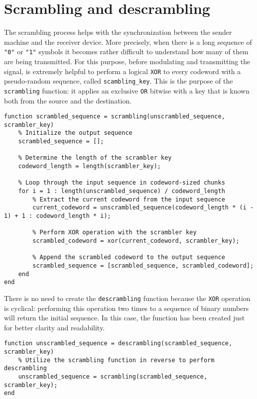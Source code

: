\vspace{40px} \section{Scrambling and descrambling}
The scrambling process helps with the synchronization between the sender machine and the receiver device. More precisely, when there is a long sequence of \texttt{"0"} or \texttt{"1"} symbols it becomes rather difficult to understand how many of them are being transmitted. For this purpose, before modulating and transmitting the signal, is extremely helpful to perform a logical \texttt{XOR} to every codeword with a pseudo-random sequence, called \texttt{scambling\_key}. This is the purpose of the \texttt{scrambling} function: it applies an exclusive \texttt{OR} bitwise with a key that is known both from the source and the destination.

\begin{lstlisting}
function scrambled_sequence = scrambling(unscrambled_sequence, scrambler_key)
    % Initialize the output sequence
    scrambled_sequence = [];

    % Determine the length of the scrambler key
    codeword_length = length(scrambler_key);

    % Loop through the input sequence in codeword-sized chunks
    for i = 1 : length(unscrambled_sequence) / codeword_length
        % Extract the current codeword from the input sequence
        current_codeword = unscrambled_sequence(codeword_length * (i - 1) + 1 : codeword_length * i);
        
        % Perform XOR operation with the scrambler key
        scrambled_codeword = xor(current_codeword, scrambler_key);

        % Append the scrambled codeword to the output sequence
        scrambled_sequence = [scrambled_sequence, scrambled_codeword];
    end
end
\end{lstlisting}

\noindent There is no need to create the \texttt{descrambling} function because the \texttt{XOR} operation is cyclical: performing this operation two times to a sequence of binary numbers will return the initial sequence. In this case, the function has been created just for better clarity and readability.

\begin{lstlisting}
function unscrambled_sequence = descrambling(scrambled_sequence, scrambler_key)
    % Utilize the scrambling function in reverse to perform descrambling
    unscrambled_sequence = scrambling(scrambled_sequence, scrambler_key);
end
\end{lstlisting}

